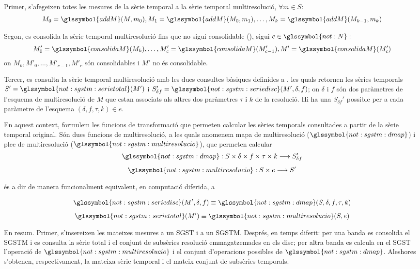 Primer, s'afegeixen totes les mesures de la sèrie temporal a la sèrie temporal
multiresolució, $\forall m \in S:$
\[
M_0=\glssymbol{addM}(M,m_0),M_1=\glssymbol{addM}(M_0,m_1),\dotsc,M_k=\glssymbol{addM}(M_{k-1},m_k)
\]

Segon, es consolida la sèrie temporal multiresolució fins que no sigui
consolidable (), sigui
$c\in\glssymbol{not:N}:$
\[
M'_0=\glssymbol{consolidaM}(M_k),\dotsc,M'_{c}=\glssymbol{consolidaM}(M'_{c-1}),M'=\glssymbol{consolidaM}(M'_{c})
\]
on $M_k,M'_{0},\dotsc,M'_{c-1},M'_{c}$ són consolidables i $M'$ no és
consolidable.  

Tercer, es consulta la sèrie temporal multiresolució amb les dues
consultes bàsiques definides a , les
quals retornen les sèries temporals
$S'=\glssymbol{not:sgstm:serietotal}(M')$ i $S_{\delta
  f}'=\glssymbol{not:sgstm:seriedisc}(M',\delta,f)$; on $\delta$ i $f$
són dos paràmetres de l'esquema de multiresolució de $M$ que estan
associats als altres dos paràmetres $\tau$ i $k$ de la resolució.  Hi
ha una $S_{\delta f}'$ possible per a cada paràmetre de l'esquema
$(\delta,f,\tau,k) \in e$.



En aquest context, formulem les funcions de transformació que permeten
calcular les sèries temporals consultades a partir de la sèrie
temporal original. Són dues funcions de multiresolució, a les
quals anomenem mapa de multiresolució ($\glssymbol{not:sgstm:dmap}$) i
plec de multiresolució ($\glssymbol{not:sgstm:multiresolucio}$), que
permeten calcular
\[
\glssymbol{not:sgstm:dmap}: S \times \delta \times f \times \tau \times k \longrightarrow
S'_{\delta f}
\]
\[
 \glssymbol{not:sgstm:multiresolucio}: S \times e  \longrightarrow S'
\]


és a dir de manera funcionalment equivalent, en computació diferida, a

\[
\glssymbol{not:sgstm:seriedisc}(M',\delta,f) \equiv
\glssymbol{not:sgstm:dmap}(S,\delta,f,\tau,k)
\]
\[
\glssymbol{not:sgstm:serietotal}(M') \equiv \glssymbol{not:sgstm:multiresolucio}(S,e)
\]


En resum. Primer, s'insereixen les mateixes mesures a un \gls{SGST} i
a un \gls{SGSTM}. Després, en temps diferit: per una banda es
consolida el \gls{SGSTM} i es consulta la sèrie total i el conjunt de
subsèries resolució emmagatzemades en els disc; per altra banda es
calcula en el \gls{SGST} l'operació de
$\glssymbol{not:sgstm:multiresolucio}$ i el conjunt d'operacions
possibles de $\glssymbol{not:sgstm:dmap}$. Aleshores s'obtenen,
respectivament, la mateixa sèrie temporal i el mateix conjunt de
subsèries temporals.






